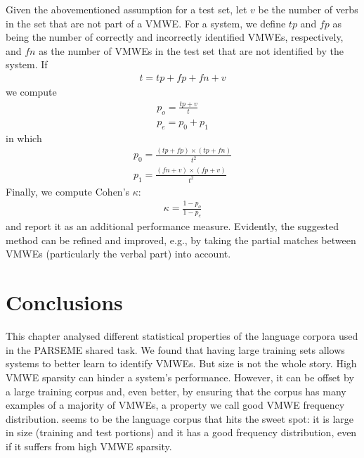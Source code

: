 \documentclass[output=paper
,modfonts
,nonflat,draftmode]{langsci/langscibook}
\begin{document}
Given the abovementioned assumption for a test set, let $v$ be the number of verbs in the set that are not part of a VMWE. For a system, we define $tp$ and $fp$ as being the number of correctly and incorrectly identified VMWEs, respectively, and $fn$ as the number of VMWEs in the test set that are not identified by the system. If 
\begin{align*}
t= tp + fp + fn + v
\end{align*} 
we compute 
\begin{align*}
p_o=\frac{tp+v}{t}\\
p_e = p_0 + p_1
\end{align*}
in which
\begin{align*}
p_0 =\frac{(tp+fp)\times(tp+fn)}{t^2}\\
p_1 =\frac{(fn+v)\times(fp+v)}{t^2} 
\end{align*}
Finally, we compute Cohen's $\kappa$:
\begin{align*}
\kappa = \frac{1-p_o}{1-p_e}
\end{align*}
and report it as an additional performance measure. Evidently, the suggested method can be refined and improved, e.g., by taking the partial matches between VMWEs (particularly the verbal part) into account.




\section{Conclusions}
\label{conclude}

This chapter analysed different statistical properties of the language corpora used in the PARSEME shared task. We found that having large training sets allows systems to better learn to identify VMWEs. But size is not the whole story. High VMWE sparsity can hinder a system's performance. However, it can be offset by a large training corpus and, even better, by ensuring that the corpus has many examples of a majority of VMWEs, a property we call good VMWE frequency distribution.  seems to be the language corpus that hits the sweet spot: it is large in size (training and test portions) and it has a good frequency distribution, even if it suffers from high VMWE sparsity. 
\end{document}
